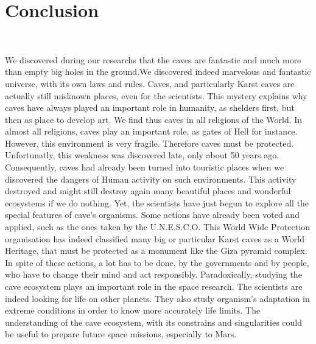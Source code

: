 \documentclass[draft, final]{report}
\begin{document}
\chapter*{Conclusion}
~\newline
~\par
We discovered during our researchs that the caves are fantastic and much more than empty big holes in the ground.We discovered indeed marvelous and fantastic
universe, with its own laws and rules. Caves, and particularly Karst caves are actually still misknown places, even for the scientists. This mystery explains why caves have always played an important role in humanity, as shelders first, but then as place to develop art. We find thus caves in all religions of the World. In almost all religions, caves play an important role, as gates of Hell for instance. However, this environment is very fragile. Therefore caves must be protected. Unfortunatly, this weakness was discovered late, only about 50 years ago. Consequently, caves had already been turned into touristic places when we discovered the dangers of Human activity on such environments. This activity destroyed and might still destroy again many beautiful places and wonderful ecosystems if we do nothing. Yet, the scientists have just begun to explore all the special features of cave’s organisms. Some actions have already been voted and applied, such as the ones taken by the U.N.E.S.C.O. This World Wide Protection organisation has indeed classified many big or particular Karst caves as a World Heritage, that must be protected as a monument like the Giza pyramid complex. In spite of these actions, a lot has to be done, by the governments and by people, who have to change their mind and act responsibly.
Paradoxically, studying the cave ecosystem plays an important role in the space research. The scientists are indeed looking for life on other planets. They also study organism's adaptation in extreme conditions in order to know more accurately life limits. The understanding of the cave ecosystem, with its constrains and singularities could be useful to prepare future space missions, especially to Mars.
\newpage
\end{document}
